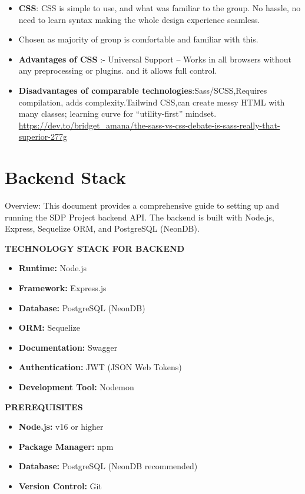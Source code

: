 \begin{itemize}
    \item \textbf{CSS}: CSS is simple to use, and what was familiar to the group. No hassle, no need to learn syntax making the whole design experience seamless.
    \item Chosen as majority of group is comfortable and familiar with this.
    \item\textbf {Advantages of CSS} :- Universal Support – Works in all browsers without any preprocessing or plugins. and it allows full control.
    \item \textbf{Disadvantages of comparable technologies}:Sass/SCSS,Requires compilation, adds complexity.Tailwind CSS,can create messy HTML with many classes; learning curve for “utility-first” mindset.
    \url{https://dev.to/bridget_amana/the-sass-vs-css-debate-is-sass-really-that-superior-277g}
\end{itemize}


\section{Backend Stack}
Overview:
This document provides a comprehensive guide to setting up and running the SDP Project backend API. The backend is built with Node.js, Express, Sequelize ORM, and PostgreSQL (NeonDB).

\textbf{TECHNOLOGY STACK FOR BACKEND}

\begin{itemize}
    \item \textbf{Runtime:} Node.js
    \item \textbf{Framework:} Express.js
    \item \textbf{Database:} PostgreSQL (NeonDB)
    \item \textbf{ORM:} Sequelize
    \item \textbf{Documentation:} Swagger
    \item \textbf{Authentication:} JWT (JSON Web Tokens)
    \item \textbf{Development Tool:} Nodemon
\end{itemize}

\textbf{PREREQUISITES} 
\begin{itemize}
    \item \textbf{Node.js:} v16 or higher
    \item \textbf{Package Manager:} npm
    \item \textbf{Database:} PostgreSQL (NeonDB recommended)
    \item \textbf{Version Control:} Git
\end{itemize}


